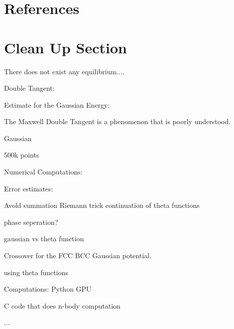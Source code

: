 \documentclass[onecolumn,11pt,final]{amsart}
\begin{document}
\section{References}





\section{Clean Up Section}

There does not exist any equilibrium....   

Double Tangent:


Estimate for the Gaussian Energy:  


The Maxwell Double Tangent is a phenomenon that is poorly understood.  


Gaussian

500k points

Numerical Computations:

Error estimates:   


Avold summation
Riemann trick continuation of theta functions

phase seperation?


gaussian vs theta function


Crossover for the FCC BCC Gaussian potential.   


using theta functions



Computations:  Python GPU

C code that does n-body computation










...
\end{document}
